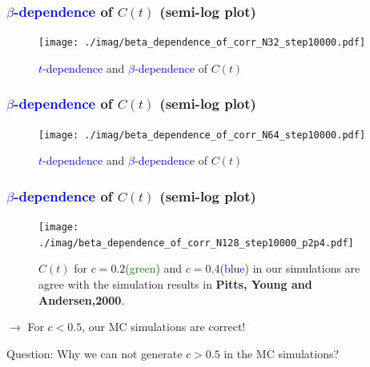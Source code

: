 \documentclass[8pt]{beamer}
\begin{document}
\begin{frame}
	\frametitle{{\textcolor{blue}{$\beta$-dependence}} of $C(t)$ (semi-log plot)}
	\begin{figure}
		\centering
		\texttt{[image: ./imag/beta\_dependence\_of\_corr\_N32\_step10000.pdf]}
		\setlength{\abovecaptionskip}{0pt}
		\caption{{\textcolor{blue}{$t$-dependence}} and {\textcolor{blue}{$\beta$-dependence}} of $C(t)$}
	\end{figure}
\end{frame}
\begin{frame}
	\frametitle{{\textcolor{blue}{$\beta$-dependence}} of $C(t)$ (semi-log plot)}
	\begin{figure}
		\centering
		\texttt{[image: ./imag/beta\_dependence\_of\_corr\_N64\_step10000.pdf]}
		\setlength{\abovecaptionskip}{0pt}
		\caption{{\textcolor{blue}{$t$-dependence}} and {\textcolor{blue}{$\beta$-dependence}} of $C(t)$}
	\end{figure}
\end{frame}
\begin{frame}
	\frametitle{{\textcolor{blue}{$\beta$-dependence}} of $C(t)$ (semi-log plot)}
 \begin{figure}
	\centering
	\texttt{[image: ./imag/beta\_dependence\_of\_corr\_N128\_step10000\_p2p4.pdf]}
	\setlength{\abovecaptionskip}{0pt}
	\caption{$C(t)$ for $c=0.2$({\textcolor{green}{green}}) and $c=0.4$({\textcolor{blue}{blue}}) in our simulations  are agree with the simulation results in \textbf{Pitts, Young and Andersen,2000}.}
\end{figure}
$\rightarrow$ For $c < 0.5$, our MC simulations are correct! 

Question: Why we can not generate $c >0.5$ in the MC simulations?
\end{frame}
\end{document}
